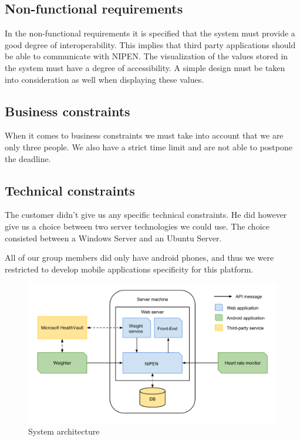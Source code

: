 \subsection{Non-functional requirements}

In the non-functional requirements it is specified that the system must provide a good degree of interoperability.
This implies that third party applications should be able to communicate with NIPEN.
The visualization of the values stored in the system must have a degree of accessibility.
A simple design must be taken into consideration as well when displaying these values.

\subsection{Business constraints}
\label{subsec:business-constraints}

When it comes to business constraints we must take into account that we are only three people.
We also have a strict time limit and are not able to postpone the deadline.

\subsection{Technical constraints}

The customer didn't give us any specific technical constraints.
He did however give us a choice between two server technologies we could use.
The choice consisted between a Windows Server and an Ubuntu Server.

All of our group members did only have android phones, and thus we were restricted to develop mobile applications specificity for this platform.

\begin{figure}[h]
\centering
\includegraphics[scale=0.5]{../Figures/architecture.pdf}
\caption{System architecture}
\label{figure:architecture}
\end{figure}

